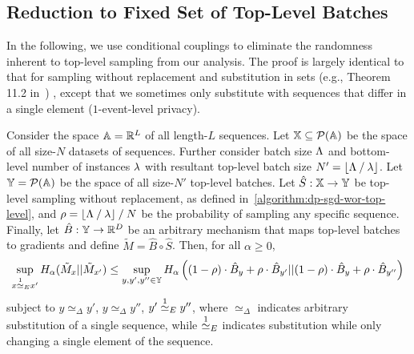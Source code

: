 \subsection{Reduction to Fixed Set of Top-Level Batches}
In the following, we use conditional couplings to eliminate the randomness inherent to top-level sampling from our analysis. 
The proof is largely identical to that for sampling without replacement and substitution in sets
(e.g., Theorem 11.2 in~\cite{zhu2022optimal})
, except that we sometimes only substitute with sequences that differ in a single element ($1$-event-level privacy).
\begin{lemma}\label{lemma:wor_top_level_reduction}
    Consider the space ${\mathbb{A}} = {\mathbb{R}}^L$ of all length-$L$ sequences.
    Let ${\mathbb{X}} \subseteq \mathcal{P}({\mathbb{A}})$ be the space of all size-$N$ datasets of sequences.
    Further consider batch size $\Lambda$ and bottom-level number of instances $\lambda$
    with resultant top-level batch size $N' = \lfloor \Lambda \mathbin{/} \lambda \rfloor$.
    Let ${\mathbb{Y}} = \mathcal{P}({\mathbb{A}})$ be the space of all size-$N'$ top-level batches.
    Let $\hat{S} : {\mathbb{X}} \rightarrow {\mathbb{Y}}$ be top-level sampling without replacement, as defined in~\cref{algorithm:dp-sgd-wor-top-level},
    and $\rho = \lfloor \Lambda \mathbin{/} \lambda \rfloor \mathbin{/} N$ be the probability of sampling any specific sequence.
    Finally, let $\hat{B} : {\mathbb{Y}} \rightarrow {\mathbb{R}}^D$ be an arbitrary mechanism that maps top-level batches to gradients
    and define $\tilde{M} = \hat{B} \circ \hat{S}$.
    Then, for all $\alpha \geq 0$,
    \begin{equation*}
        \sup_{x \overset{1}{\simeq}_{E} x'} H_\alpha(\tilde{M}_x || \tilde{M}_{x'})
        \leq
        \sup_{y, y', y'' \in {\mathbb{Y}}}
        H_\alpha\left((1 - \rho) \cdot \hat{B}_{y} + \rho \cdot \hat{B}_{y'}
            ||
            (1 - \rho) \cdot \hat{B}_{y} + \rho \cdot \hat{B}_{y''}\right)
    \end{equation*}
    subject to $y \simeq_\Delta y'$, $y \simeq_\Delta y''$, $y' \overset{1}{\simeq}_{E} y''$, where $\simeq_\Delta$ indicates arbitrary substitution of a single sequence, while $\overset{1}{\simeq}_{E}$ indicates substitution while only changing a single element of the sequence.
\end{lemma}

